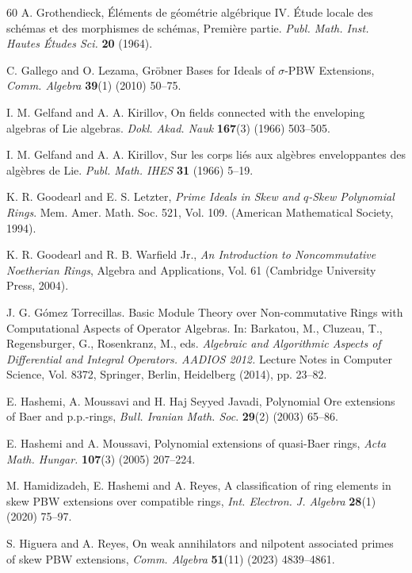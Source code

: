 \documentclass{amsart}
\theoremstyle{definition}
\theoremstyle{remark}
\numberwithin{equation}{section}
\begin{document}
\begin{thebibliography}{60}
 A. Grothendieck, \'El\'ements de g\'eom\'etrie alg\'ebrique IV. \'Etude locale des sch\'emas et des morphismes de sch\'emas, Premi\`ere partie. {\em Publ. Math. Inst. Hautes Études Sci.} {\bf 20}  (1964).

 C. Gallego and O. Lezama, Gr{\"o}bner {B}ases for {I}deals of $\sigma$-{P}{B}{W} {E}xtensions, {\em Comm. Algebra} {\bf 39}(1) (2010) 50--75.

 I. M. Gelfand and A. A. Kirillov, On fields connected with the enveloping algebras of {L}ie algebras. {\em Dokl. Akad. Nauk} {\bf 167}(3) (1966) 503--505.

 I. M. Gelfand and A. A. Kirillov, Sur les corps li\'es aux alg\`ebres enveloppantes des alg\`ebres de Lie. {\em Publ. Math. IHES} {\bf 31} (1966) 5--19.

 K. R. Goodearl and E. S. Letzter, {\em Prime {I}deals in {S}kew and $q$-{S}kew {P}olynomial {R}ings}. Mem. Amer. Math. Soc. 521, Vol. 109. (American Mathematical Society, 1994).

 K. R. Goodearl and R. B. Warfield Jr., {\em An Introduction to Noncommutative Noetherian Rings}, Algebra and Applications, Vol. 61 (Cambridge University Press, 2004).

 J. G. G\'omez Torrecillas. Basic Module Theory over Non-commutative Rings with Computational Aspects of Operator Algebras. In: Barkatou, M., Cluzeau, T., Regensburger, G., Rosenkranz, M., eds. {\em Algebraic and Algorithmic Aspects of Differential and Integral Operators. AADIOS 2012.} Lecture Notes in Computer Science, Vol. 8372, Springer, Berlin, Heidelberg (2014), pp. 23--82.

 E. Hashemi, A. Moussavi and H. Haj Seyyed Javadi, Polynomial Ore extensions of Baer and p.p.-rings, {\em Bull. Iranian Math. Soc}. {\bf 29}(2) (2003)  65--86.

E. Hashemi and A. Moussavi, Polynomial extensions of quasi-Baer rings, {\em Acta Math. Hungar.} {\bf 107}(3) (2005) 207--224.

 M. Hamidizadeh, E. Hashemi and A. Reyes, A classification of ring elements in skew PBW extensions over compatible rings, {\em Int. Electron. J. Algebra} {\bf 28}(1) (2020) 75--97.

 S. Higuera and A. Reyes, On weak annihilators and nilpotent associated primes of skew PBW extensions, {\em Comm. Algebra} {\bf 51}(11) (2023) 4839--4861.


\end{thebibliography}
\end{document}
